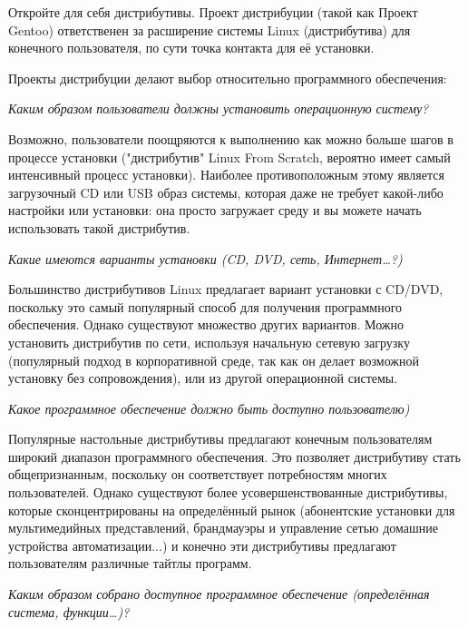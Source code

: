 \documentclass[10pt]{book}
\begin{document}
Откройте для себя дистрибутивы. Проект дистрибуции (такой как Проект Gentoo) ответственен за расширение системы Linux (дистрибутива) для конечного пользователя, по сути точка контакта для её установки.

Проекты дистрибуции делают выбор относительно программного обеспечения:

\begin{flushright}
{\color{gentoo}\emph{Каким образом пользователи должны установить операционную систему?}}
\end{flushright}


Возможно, пользователи поощряются к выполнению как можно больше шагов в  процессе установки ("дистрибутив" Linux From Scratch, вероятно имеет самый интенсивный процесс установки). Наиболее противоположным этому является загрузочный CD или USB образ системы, которая даже не требует какой-либо настройки или установки: она просто загружает среду и вы можете начать использовать такой дистрибутив.

\begin{flushright}
{\color{gentoo}\emph{Какие имеются варианты установки (CD, DVD, сеть, Интернет\ldots?)}}
\end{flushright}

Большинство дистрибутивов Linux предлагает вариант установки с CD/DVD, поскольку это самый популярный способ для получения программного обеспечения. Однако существуют множество других вариантов. Можно установить дистрибутив по сети, используя начальную сетевую загрузку (популярный подход в корпоративной среде, так как он делает возможной установку без сопровождения), или из другой операционной системы.

\begin{flushright}
{\color{gentoo}\emph{Какое программное обеспечение должно быть доступно пользователю)}}
\end{flushright}

Популярные настольные дистрибутивы предлагают конечным пользователям широкий диапазон программного обеспечения. Это позволяет дистрибутиву стать общепризнанным, поскольку он соответствует потребностям многих пользователей. Однако существуют более усовершенствованные дистрибутивы, которые сконцентрированы на определённый рынок (абонентские установки для мультимедийных представлений, брандмауэры и управление сетью домашние устройства автоматизации...) и конечно эти дистрибутивы предлагают пользователям различные тайтлы программ.

\begin{flushright}
{\color{gentoo}\emph{Каким образом собрано доступное программное обеспечение (определённая система, функции\ldots)?}}
\end{flushright}
\end{document}
